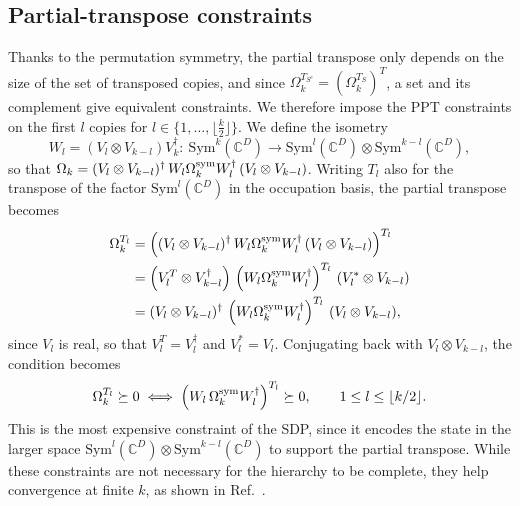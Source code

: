 \documentclass[aps,pra,twocolumn,superscriptaddress]{revtex4-2}
\newcommand{\C}{\mathds{C}}
\begin{document}
\begin{widetext}
\subsection{Partial-transpose constraints}
Thanks to the permutation symmetry, the partial transpose only depends on the size of the set of transposed copies, and since $\Omega_k^{T_{S^c}}=(\Omega_k^{T_S})^T$, a set and its complement give equivalent constraints. We therefore impose the PPT constraints on the first $l$ copies for $l \in \{1, \dots, \lfloor \tfrac{k}{2} \rfloor\}$. We define the isometry
\begin{equation}
    W_l=(V_l\otimes V_{k-l})V_k^\dagger:\ \text{Sym}^k(\C^D)\to\text{Sym}^l(\C^D)\otimes\text{Sym}^{k-l}(\C^D),
\end{equation}
so that $\Omega_k=(V_l\otimes V_{k-l})^\dagger\,W_l\Omega_k^{\rm sym}W_l^\dagger\,(V_l\otimes V_{k-l})$. Writing $T_l$ also for the transpose of the factor $\text{Sym}^l(\C^D)$ in the occupation basis, the partial transpose becomes
\begin{align}
    \Omega_k^{T_l} &= \left((V_l\otimes V_{k-l})^\dagger\,W_l\Omega_k^{\rm sym}W_l^\dagger\,(V_l\otimes V_{k-l})\right)^{T_l}\\
    &=\left(V_l^T\otimes V_{k-l}^\dagger\right)\,\left(W_l\Omega_k^{\rm sym}W_l^\dagger\right)^{T_l}\,\left(V_l^*\otimes V_{k-l}\right)\\
    &= (V_l\otimes V_{k-l})^\dagger\,\left(W_l\Omega_k^{\rm sym}W_l^\dagger\right)^{T_l}\,(V_l\otimes V_{k-l}),
\end{align}
since $V_l$ is real, so that $V_l^T=V_l^\dagger$ and $V_l^*=V_l$. Conjugating back with $V_l\otimes V_{k-l}$, the condition becomes
\begin{equation}
    \Omega_k^{T_l}\succeq0\iff\left(W_l\,\Omega_k^{\rm sym}W_l^\dagger\right)^{T_l}\succeq0,\qquad 1\leq l\leq\lfloor k/2\rfloor.
\end{equation}
This is the most expensive constraint of the SDP, since it encodes the state in the larger space $\text{Sym}^l(\C^D)\otimes\text{Sym}^{k-l}(\C^D)$ to support the partial transpose. While these constraints are not necessary for the hierarchy to be complete, they help convergence at finite $k$, as shown in Ref.~\cite{Navascues2009}.


\end{widetext}
\end{document}
